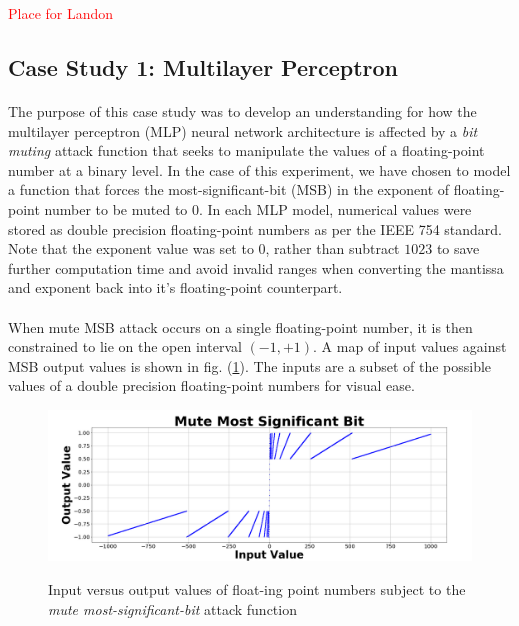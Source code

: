 \documentclass[12pt,letterpaper]{article}
\begin{document}
\textcolor{red}{Place for Landon}

\subsection{Case Study 1: Multilayer Perceptron}

\paragraph*{}The purpose of this case study was to develop an understanding for how the multilayer perceptron (MLP) neural network architecture is affected by a \textit{bit muting} attack function that seeks to manipulate the values of a floating-point number at a binary level. In the case of this experiment, we have chosen to model a function that forces the most-significant-bit (MSB) in the exponent of floating-point number to be muted to $0$. In each MLP model, numerical values were stored as double precision floating-point numbers as per the IEEE 754 standard. Note that the exponent value was set to $0$, rather than subtract $1023$ to save further computation time and avoid invalid ranges when converting the mantissa and exponent back into it's floating-point counterpart.
\paragraph*{}When mute MSB attack occurs on a single floating-point number,  it is then constrained to lie on the open interval $(-1,+1)$. A map of input values against MSB output values is shown in fig. (\ref{MUTE MSB}). The inputs are a subset of the possible values of a double precision floating-point numbers for visual ease.

\begin{figure}[h]
	\centering
	\includegraphics[scale=0.3]{Mute_Most_Significant_Bit}
	\label{MUTE MSB}
	\caption{Input versus output values of float-ing point numbers subject to the \textit{mute most-significant-bit} attack function}
\end{figure}
\end{document}
